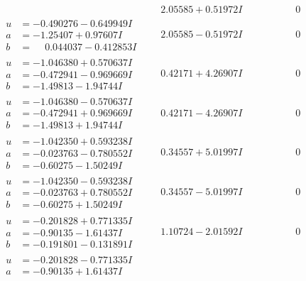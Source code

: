 \documentclass[1p]{elsarticle_modified}
\theoremstyle{definition}
\begin{document}
$$\begin{array}{c|c|c}
 & \phantom{-}2.05585 + 0.51972 I & \phantom{-0.000000 } 0 \\ \hline\begin{aligned}
u &= -0.490276 - 0.649949 I \\
a &= -1.25407 + 0.97607 I \\
b &= \phantom{-}0.044037 - 0.412853 I\end{aligned}
 & \phantom{-}2.05585 - 0.51972 I & \phantom{-0.000000 } 0 \\ \hline\begin{aligned}
u &= -1.046380 + 0.570637 I \\
a &= -0.472941 - 0.969669 I \\
b &= -1.49813 - 1.94744 I\end{aligned}
 & \phantom{-}0.42171 + 4.26907 I & \phantom{-0.000000 } 0 \\ \hline\begin{aligned}
u &= -1.046380 - 0.570637 I \\
a &= -0.472941 + 0.969669 I \\
b &= -1.49813 + 1.94744 I\end{aligned}
 & \phantom{-}0.42171 - 4.26907 I & \phantom{-0.000000 } 0 \\ \hline\begin{aligned}
u &= -1.042350 + 0.593238 I \\
a &= -0.023763 - 0.780552 I \\
b &= -0.60275 - 1.50249 I\end{aligned}
 & \phantom{-}0.34557 + 5.01997 I & \phantom{-0.000000 } 0 \\ \hline\begin{aligned}
u &= -1.042350 - 0.593238 I \\
a &= -0.023763 + 0.780552 I \\
b &= -0.60275 + 1.50249 I\end{aligned}
 & \phantom{-}0.34557 - 5.01997 I & \phantom{-0.000000 } 0 \\ \hline\begin{aligned}
u &= -0.201828 + 0.771335 I \\
a &= -0.90135 - 1.61437 I \\
b &= -0.191801 - 0.131891 I\end{aligned}
 & \phantom{-}1.10724 - 2.01592 I & \phantom{-0.000000 } 0 \\ \hline\begin{aligned}
u &= -0.201828 - 0.771335 I \\
a &= -0.90135 + 1.61437 I \\

\end{aligned}
\end{array}$$
\end{document}
